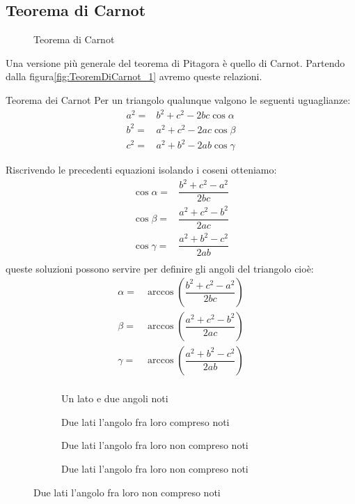 \subsection{Teorema di Carnot}
\begin{figure}
	\centering
	
	\caption{Teorema di Carnot}
	\label{fig:TeoremDiCarnot_1}
\end{figure}
Una versione più generale del teorema di Pitagora è quello di Carnot. Partendo dalla figura\nobs\vref{fig:TeoremDiCarnot_1} avremo queste relazioni.
\begin{teoremat}{Teorema dei Carnot}{}
	Per un triangolo qualunque valgono le seguenti uguaglianze:
	\begin{align*}
	a^2=&b^2+c^2-2bc\cos\alpha\\
	b^2=&a^2+c^2-2ac\cos\beta\\
	c^2=&a^2+b^2-2ab\cos\gamma
	\end{align*}
\end{teoremat}
Riscrivendo  le precedenti equazioni isolando i coseni otteniamo:
\begin{align*}
\cos\alpha=&\dfrac{b^2+c^2-a^2}{2bc}\\
\cos\beta=&\dfrac{a^2+c^2-b^2}{2ac}\\
\cos\gamma=&\dfrac{a^2+b^2-c^2}{2ab}\\
\end{align*}
queste soluzioni possono servire per definire gli angoli del triangolo cioè:
\begin{align*}
\alpha=&\arccos(\dfrac{b^2+c^2-a^2}{2bc})\\
\beta=&\arccos(\dfrac{a^2+c^2-b^2}{2ac})\\
\gamma=&\arccos(\dfrac{a^2+b^2-c^2}{2ab})\\
\end{align*}
\begin{figure}
	\begin{subfigure}[b]{.5\linewidth}
		\centering

	\caption{Un lato e due angoli noti}
	\label{fig:risTriangQqualunque_1}
	\end{subfigure}%
	\begin{subfigure}[b]{.5\linewidth}
		\centering
	
		\caption{Due lati l'angolo fra loro compreso noti}
		\label{fig:risTriangQqualunque_2}
	\end{subfigure}
	\begin{subfigure}[b]{.5\linewidth}
		\centering
		
		\caption{Due lati l'angolo fra loro non compreso noti}
		\label{fig:risTriangQqualunque_3}
	\end{subfigure}%
	\begin{subfigure}[b]{.5\linewidth}
		\centering
		
		\caption{Due lati l'angolo fra loro non compreso noti}
		\label{fig:risTriangQqualunque_4}
	\end{subfigure}
	\label{fig:RisoluzioneTriangoliQualunque}
\end{figure}
